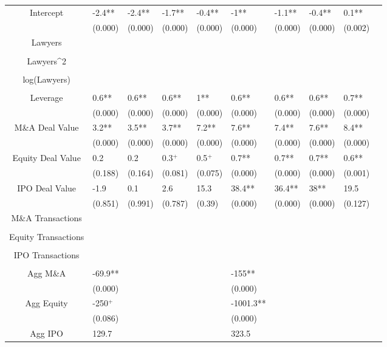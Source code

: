 \documentclass{article}
\begin{document}
\begin{table}[H]
\begin{tabular}{|clllllllll|}
Intercept & -2.4** & -2.4** & -1.7** & -0.4** & -1** & -1.1** & -0.4** & 0.1** & \\
   & (0.000) & (0.000) & (0.000) & (0.000) & (0.000) & (0.000) & (0.000) & (0.002) & \\
  Lawyers &  &  &  &  &  &  &  &  & \\
   &  &  &  &  &  &  &  &  & \\
  Lawyers^2 &  &  &  &  &  &  &  &  & \\
   &  &  &  &  &  &  &  &  & \\
  log(Lawyers) &  &  &  &  &  &  &  &  & \\
   &  &  &  &  &  &  &  &  & \\
  Leverage & 0.6** & 0.6** & 0.6** & 1** & 0.6** & 0.6** & 0.6** & 0.7** & \\
   & (0.000) & (0.000) & (0.000) & (0.000) & (0.000) & (0.000) & (0.000) & (0.000) & \\
  M\&A Deal Value & 3.2** & 3.5** & 3.7** & 7.2** & 7.6** & 7.4** & 7.6** & 8.4** & \\
   & (0.000) & (0.000) & (0.000) & (0.000) & (0.000) & (0.000) & (0.000) & (0.000) & \\
  Equity Deal Value & 0.2 & 0.2 & 0.3$^{+}$ & 0.5$^{+}$ & 0.7** & 0.7** & 0.7** & 0.6** & \\
   & (0.188) & (0.164) & (0.081) & (0.075) & (0.000) & (0.000) & (0.000) & (0.001) & \\
  IPO Deal Value & -1.9 & 0.1 & 2.6 & 15.3 & 38.4** & 36.4** & 38** & 19.5 & \\
   & (0.851) & (0.991) & (0.787) & (0.39) & (0.000) & (0.000) & (0.000) & (0.127) & \\
  M\&A Transactions &  &  &  &  &  &  &  &  & \\
   &  &  &  &  &  &  &  &  & \\
  Equity Transactions &  &  &  &  &  &  &  &  & \\
   &  &  &  &  &  &  &  &  & \\
  IPO Transactions &  &  &  &  &  &  &  &  & \\
   &  &  &  &  &  &  &  &  & \\
  Agg M\&A & -69.9** &  &  &  & -155** &  &  &  & \\
   & (0.000) &  &  &  & (0.000) &  &  &  & \\
  Agg Equity & -250$^{+}$ &  &  &  & -1001.3** &  &  &  & \\
   & (0.086) &  &  &  & (0.000) &  &  &  & \\
  Agg IPO & 129.7 &  &  &  & 323.5 &  &  &  & \\

\end{tabular}
\end{table}
\end{document}

